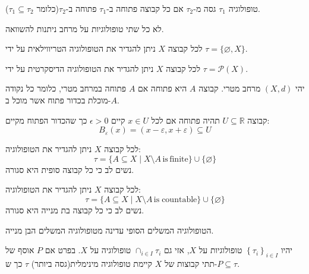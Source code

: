\documentclass{tstextbook}
\begin{document}
\begin{definition}
טופולוגיה \(\tau_{1}\) גסה מ-\(\tau_{2}\) אם כל קבוצה פתוחה ב-\(\tau_{1}\) פתוחה ב-\(\tau_{2}\)(כלומר \(\tau_{1}\subseteq \tau_{2}\)).

\end{definition}
\begin{remark}
לא כל שתי טופולוגיות על מרחב ניתנות להשוואה.

\end{remark}
\begin{example}
לכל קבוצה \(X\) ניתן להגדיר את הטופולוגיה הטריווילאית על ידי \(\tau=\{ \varnothing,X \}\).

\end{example}
\begin{example}
לכל קבוצה \(X\) ניתן להגדיר את הטופולוגיה הדיסקרטית על ידי \(\tau=\mathcal{P}(X)\).

\end{example}
\begin{definition}
יהי \((X,d)\) מרחב מטרי. קבוצה \(A\) היא פתוחה אם \(A\) פתוחה במרחב מטרי, כלומר כל נקודה מוכלת בכדור פתוח אשר מוכל ב-\(A\).

\end{definition}
\begin{example}
קבוצה \(U\subseteq \mathbb{R}\) תהיה פתוחה אם לכל \(x \in U\) קיים \(\epsilon>0\) כך שהכדור הפתוח מקיים:
$$B_{\varepsilon}(x)=(x-\varepsilon,x+\varepsilon)\subseteq U$$

\end{example}
\begin{example}
לכל קבוצה \(X\) ניתן להגדיר את הטופולוגיה:
$$\tau=\{A\subseteq X\mid X\setminus A\,\mathrm{is\,finite}\}\cup\{\varnothing \}$$
נשים לב כי כל קבוצה סופית היא סגורה.

\end{example}
\begin{example}
לכל קבוצה \(X\) ניתן להגדיר את הטופולוגיה:
$$\tau=\{A\subseteq X\mid X\setminus A\,\mathrm{is\;countable}\}\cup\{\varnothing \}$$
נשים לב כי כל קבוצה בת מנייה היא סגורה.

\end{example}
\begin{proposition}
הטופולוגיה המשלים הסופי עדינה מטופולוגיה המשלים הבן מנייה.

\end{proposition}
\begin{example}
יהיו \(\left\{  \tau_{i}  \right\}_{i\in I}\) טופולוגיות על \(X\), אזי גם \(\cap_{i \in I}\tau_{i}\) טופולוגיה על \(X\). בפרט אם \(P\) אוסף של תתי קבוצות של \(X\) קיימת טופולוגיה מינימלית(גסה ביותר) \(\tau\) כך ש-\(P\subseteq \tau\).

\end{example}
\end{document}
